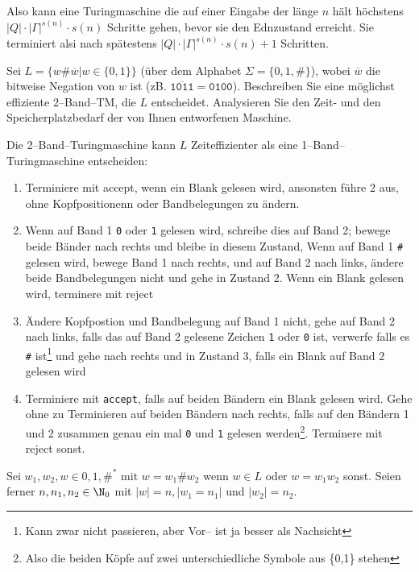 \documentclass[listings, a4paper, 11pt]{homeworkassignment}
\newcommand{\task}[1]{
  \begin{framed}
    \keyword{Problem:} #1
  \end{framed}
}
\newcommand*\bitneg[1]{\overline{#1}}
\newcommand*\card[1]{\left|#1\right|}
\begin{document}
Also kann eine Turingmaschine die auf einer Eingabe der länge \(n\)
hält höchstens \(\card{Q} \cdot \card{\Gamma}^{s(n)} \cdot s(n)\)
Schritte gehen, bevor sie den Ednzustand erreicht.  Sie terminiert
alsi nach spätestens \(\card{Q} \cdot \card{\Gamma}^{s(n)} \cdot s(n)
+1\) Schritten.\QED
\task{Sei \(L=\{w \# \bitneg{w} \vert w\in\{0, 1\}\}\) (über dem
  Alphabet \(\Sigma = \{0,1,\#\}\)), wobei \(\bitneg{w}\) die bitweise
  Negation von \(w\) ist (zB. \(\bitneg{\texttt{1011}} =
  \texttt{0100}\)). Beschreiben Sie eine möglichst effiziente
  2--Band--TM, die \(L\) entscheidet. Analysieren Sie den Zeit- und
  den Speicherplatzbedarf der von Ihnen entworfenen Maschine.} 
\solution
Die 2--Band--Turingmaschine kann \(L\) Zeiteffizienter als eine
1--Band--Turingmaschine entscheiden:
\begin{enumerate}
\item Terminiere mit \textsf{accept}, wenn ein Blank gelesen wird,
  ansonsten führe 2 aus, ohne Kopfpositionenn oder Bandbelegungen zu
  ändern.
\item Wenn auf Band 1 \texttt{0} oder \texttt{1} gelesen wird,
  schreibe dies auf Band 2; bewege beide Bänder nach rechts und bleibe in
  diesem Zustand, Wenn auf Band 1 \texttt{\#} gelesen wird, bewege
  Band 1 nach rechts, und auf Band 2 nach links, ändere beide
  Bandbelegungen nicht und gehe in Zustand 2. Wenn ein Blank gelesen
  wird, terminere mit \textsf{reject}
\item Ändere Kopfpostion und Bandbelegung auf Band 1 nicht, gehe auf
  Band 2 nach links, falls das auf Band 2 gelesene Zeichen \texttt{1}
  oder \texttt{0} ist, verwerfe falls es \texttt{\#} ist\footnote{Kann
    zwar nicht passieren, aber Vor-- ist ja besser als Nachsicht} und
  gehe nach rechts und in Zustand 3, falls ein Blank auf Band 2
  gelesen wird
\item Terminiere mit \texttt{accept}, falls auf beiden Bändern ein
  Blank gelesen wird. Gehe ohne zu Terminieren auf beiden Bändern nach
  rechts, falls auf den Bändern 1 und 2 zusammen genau ein mal
  \texttt{0} und \texttt{1} gelesen werden\footnote{Also die beiden
    Köpfe auf zwei unterschiedliche Symbole aus \{0,1\}
    stehen}. Terminere mit \textsf{reject} sonst.
\end{enumerate}

Sei \(w_1,w_2,w\in {0,1,\#}^*\) mit \(w=w_1\#w_2\) wenn \(w\in L\)
oder \(w=w_1w_2\) sonst. Seien
ferner \(n,n_1,n_2\in \N_0\) mit \(\card{w}=n, \card{w_1=n_1}\) und
  \(\card{w_2}=n_2\). 
\end{document}
